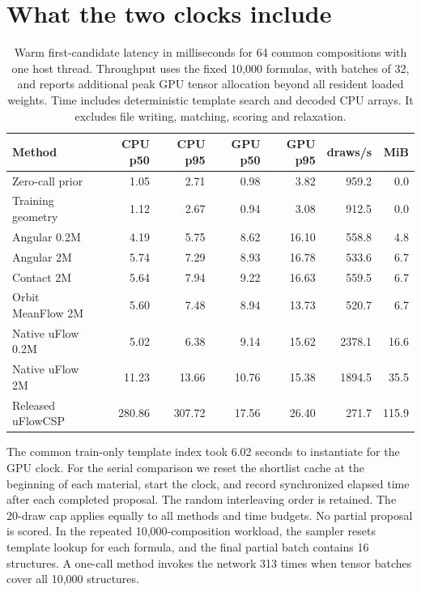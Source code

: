 \section{What the two clocks include}

\begin{table}[!htbp]\centering\small\setlength{\tabcolsep}{3.6pt}
\caption{Warm first-candidate latency in milliseconds for 64 common compositions with one host thread. Throughput uses the fixed 10,000 formulas, with batches of 32, and reports additional peak GPU tensor allocation beyond all resident loaded weights. Time includes deterministic template search and decoded CPU arrays. It excludes file writing, matching, scoring and relaxation.}
\begin{tabular}{lrrrrrr}\hline
Method & CPU p50 & CPU p95 & GPU p50 & GPU p95 & draws/s & MiB\\\hline
Zero-call prior & 1.05 & 2.71 & 0.98 & 3.82 & 959.2 & 0.0\\
Training geometry & 1.12 & 2.67 & 0.94 & 3.08 & 912.5 & 0.0\\
Angular 0.2M & 4.19 & 5.75 & 8.62 & 16.10 & 558.8 & 4.8\\
Angular 2M & 5.74 & 7.29 & 8.93 & 16.78 & 533.6 & 6.7\\
Contact 2M & 5.64 & 7.94 & 9.22 & 16.63 & 559.5 & 6.7\\
Orbit MeanFlow 2M & 5.60 & 7.48 & 8.94 & 13.73 & 520.7 & 6.7\\
Native uFlow 0.2M & 5.02 & 6.38 & 9.14 & 15.62 & 2378.1 & 16.6\\
Native uFlow 2M & 11.23 & 13.66 & 10.76 & 15.38 & 1894.5 & 35.5\\
Released uFlowCSP & 280.86 & 307.72 & 17.56 & 26.40 & 271.7 & 115.9\\
\hline\end{tabular}\end{table}

The common train-only template index took 6.02 seconds to instantiate for the GPU clock. For the serial comparison we reset the shortlist cache at the beginning of each material, start the clock, and record synchronized elapsed time after each completed proposal. The random interleaving order is retained. The 20-draw cap applies equally to all methods and time budgets. No partial proposal is scored. In the repeated 10,000-composition workload, the sampler resets template lookup for each formula, and the final partial batch contains 16 structures. A one-call method invokes the network 313 times when tensor batches cover all 10,000 structures.


